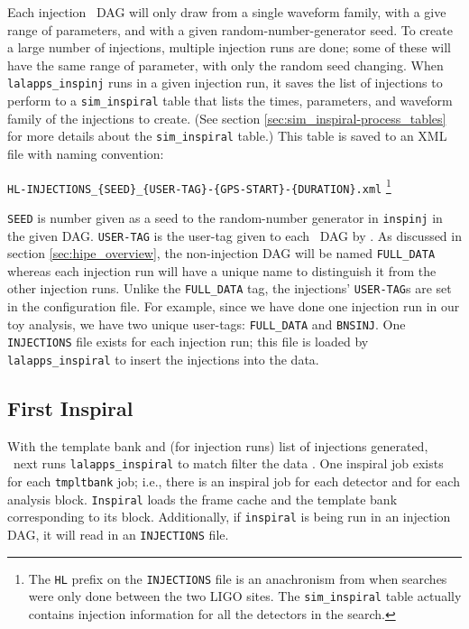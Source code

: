 Each injection \hipe~\ac{DAG} will only draw from a single waveform family,
with a give range of parameters, and with a given random-number-generator seed.
To create a large number of injections, multiple injection runs are done; some
of these will have the same range of parameter, with only the random seed
changing. When \texttt{lalapps\_inspinj} runs in a given injection run, it
saves the list of injections to perform to a \texttt{sim\_inspiral} table that
lists the times, parameters, and waveform family of the injections to create.
(See section \ref{sec:sim_inspiral-process_tables} for more details about the
\texttt{sim\_inspiral} table.) This table is saved to an XML file with naming
convention:
\begin{center}
\texttt{HL-INJECTIONS\_\{SEED\}\_\{USER-TAG\}-\{GPS-START\}-\{DURATION\}.xml}
\footnote{The \texttt{HL} prefix on the \texttt{INJECTIONS} file is an
anachronism from when searches were only done between the two \ac{LIGO} sites.
The \texttt{sim\_inspiral} table actually contains injection information for
all the detectors in the search.}
\end{center}

\texttt{SEED} is number given as a seed to the random-number generator in
\texttt{inspinj} in the given \ac{DAG}. \texttt{USER-TAG} is the user-tag given
to each \hipe~\ac{DAG} by \ihope. As discussed in section
\ref{sec:hipe_overview}, the non-injection \ac{DAG} will be named
\texttt{FULL\_DATA} whereas each injection run will have a unique name to
distinguish it from the other injection runs. Unlike the \texttt{FULL\_DATA}
tag, the injections' \texttt{USER-TAG}s are set in the configuration file. For
example, since we have done one injection run in our toy analysis, we have two
unique user-tags: \texttt{FULL\_DATA} and \texttt{BNSINJ}. One
\texttt{INJECTIONS} file exists for each injection run; this file is loaded by
\texttt{lalapps\_inspiral} to insert the injections into the data.

\subsection{First Inspiral}
\label{sec:first_inspiral}

With the template bank and (for injection runs) list of injections generated,
\hipe~next runs \texttt{lalapps\_inspiral} to match filter the data
\cite{brown-2005-22}. One inspiral job exists for each \texttt{tmpltbank} job;
i.e., there is an inspiral job for each detector and for each analysis block.
\texttt{Inspiral} loads the frame cache and the template bank corresponding to
its block. Additionally, if \texttt{inspiral} is being run in an injection
\ac{DAG}, it will read in an \texttt{INJECTIONS} file.

